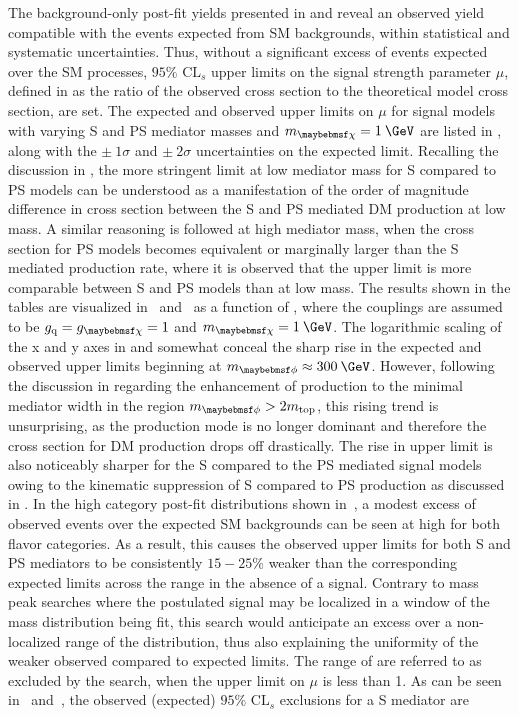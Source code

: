 The background-only post-fit yields presented in  and  reveal an observed yield compatible with the events expected from SM backgrounds, within statistical and systematic uncertainties. Thus, without a significant excess of events expected over the SM processes, $95\%$ $\textrm{CL}_{s}$ upper limits on the signal strength parameter $\mu$, defined in  as the ratio of the observed cross section to the theoretical model cross section, are set. The expected and observed upper limits on $\mu$ for signal models with varying S and PS mediator masses and $\mDM=1\:\GeV$ are listed in , along with the $\pm\:1\sigma$ and $\pm\:2\sigma$ uncertainties on the expected limit. Recalling the discussion in , the more stringent limit at low mediator mass for S compared to PS models can be understood as a manifestation of the order of magnitude difference in cross section between the S and PS mediated DM production at low mass. A similar reasoning is followed at high mediator mass, when the cross section for PS models becomes equivalent or marginally larger than the S mediated production rate, where it is observed that the upper limit is more comparable between S and PS models than at low mass. The results shown in the tables are visualized in~ and~ as a function of \mMed, where the couplings are assumed to be $\gq = \gDM = 1$ and $\mDM=1\:\GeV$. The logarithmic scaling of the x and y axes in  and  somewhat conceal the sharp rise in the expected and observed upper limits beginning at $\mMed\approx 300\:\GeV$. However, following the discussion in  regarding the enhancement of \ttbar production to the minimal mediator width in the region $\mMed > 2\mtop$, this rising trend is unsurprising, as the \XX production mode is no longer dominant and therefore the cross section for DM production drops off drastically. The rise in upper limit is also noticeably sharper for the S compared to the PS mediated signal models owing to the kinematic suppression of S compared to PS production as discussed in . In the high \mttll category post-fit \MET distributions shown in~, a modest excess of observed events over the expected SM backgrounds can be seen at high \MET for both flavor categories. As a result, this causes the observed upper limits for both S and PS mediators to be consistently $15-25\%$ weaker than the corresponding expected limits across the \mMed range in the absence of a signal. Contrary to mass peak searches where the postulated signal may be localized in a window of the mass distribution being fit, this search would anticipate an excess over a non-localized range of the \MET distribution, thus also explaining the uniformity of the weaker observed compared to expected limits. The range of \mMed are referred to as excluded by the search, when the upper limit on $\mu$ is less than 1. As can be seen in~ and~, the observed (expected) $95\%$ $\textrm{CL}_{s}$ exclusions for a S mediator are 